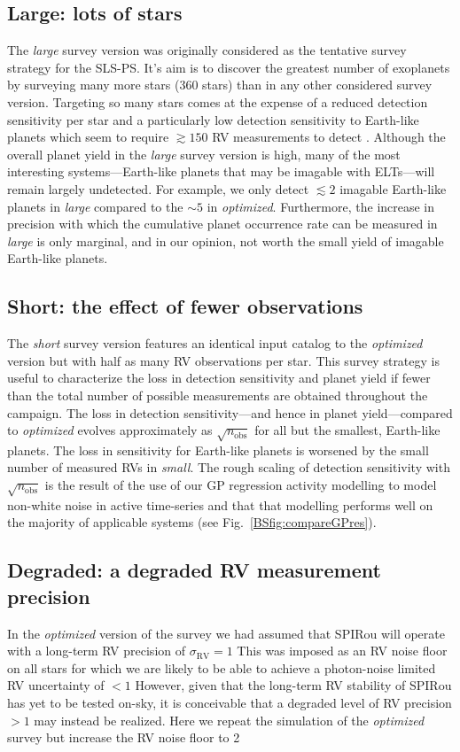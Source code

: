 \subsection{Large: lots of stars}
The \emph{large} survey version was originally considered as the tentative survey strategy for the SLS-PS.
It's aim is to discover the greatest number of exoplanets by surveying many more stars (360 stars) than
in any other considered survey version. Targeting so many stars comes at the expense of a reduced detection
sensitivity per star and a particularly low detection sensitivity to Earth-like planets which seem to require
$\gtrsim 150$ RV measurements to detect \citep[e.g.][]{astudillodefru17}. Although the
overall planet yield in the \emph{large} survey version is high, many of the most interesting
systems---Earth-like planets that may be imagable with ELTs---will remain largely undetected. For example,
we only detect $\lesssim 2$ imagable Earth-like planets in \emph{large} compared to the $\sim 5$ in
\emph{optimized}. Furthermore, the
increase in precision with which the cumulative planet occurrence rate can be measured in \emph{large} is only
marginal, and in our opinion, not worth the small yield of imagable Earth-like planets.

\subsection{Short: the effect of fewer observations}
The \emph{short} survey version features an identical input catalog to the \emph{optimized} version but
with half as many RV observations per star. This survey strategy is useful to characterize the loss in detection  
sensitivity and planet yield if fewer than the total number of possible measurements are
obtained throughout the campaign. The loss in detection sensitivity---and hence in planet yield---compared to
\emph{optimized} evolves
approximately as $\sqrt{n_{\text{obs}}}$ for all but the smallest, Earth-like planets. The loss in sensitivity
for Earth-like planets is worsened by the small number of measured RVs in \emph{small}. The rough scaling of
detection sensitivity with $\sqrt{n_{\text{obs}}}$ is the result of the use of our GP regression activity modelling
to model non-white noise in active time-series and that that modelling performs well on the majority of applicable
systems (see Fig.~\ref{BSfig:compareGPres}).

\subsection{Degraded: a degraded RV measurement precision}
In the \emph{optimized} version of the survey we had assumed that SPIRou will operate with a long-term RV precision
of $\sigma_{\text{RV}}=1$  This was imposed as an RV noise floor on all stars for which we are likely
to be able to achieve a photon-noise limited RV uncertainty of $<1$  However, given that the
long-term RV stability of SPIRou has yet to be tested on-sky, it is conceivable that a degraded level of RV precision
$>1$ \mps{} may instead be realized. Here we repeat the simulation of the \emph{optimized} survey but increase
the RV noise floor to 2 

